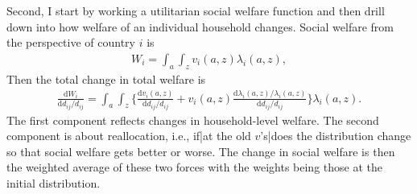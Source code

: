 \documentclass[12pt,pdftex]{article}
\begin{document}
\begin{onehalfspacing}
Second, I start by working a utilitarian social welfare function and then drill down into how welfare of an individual household changes. Social welfare from the perspective of country $i$ is
\begin{align}
W_{i} = \int_{a}\int_{z}  v_{i}(a,z)\lambda_{i}(a,z),
\label{eq:apx-social-welfare}
\end{align}
Then the total change in total welfare is
\begin{align}
\frac{\mathrm{d} W_{i}}{\mathrm{d} d_{ij} / d_{ij}} = \int_{a}\int_{z}  \bigg \{ \frac{\mathrm{d} v_i(a, z)}{\mathrm{d} d_{ij} / d_{ij}}  + v_{i}(a,z) \frac{\mathrm{d} \lambda_{i}(a,z)/ \lambda_{i}(a,z)}{\mathrm{d} d_{ij} / d_{ij}}  \bigg \} \lambda_{i}(a,z).
\label{eq:apx-social-welfare-change}
\end{align}
The first component reflects changes in household-level welfare. The second component is about reallocation, i.e., if|at the old $v$'s|does the distribution change so that social welfare gets better or worse. The change in social welfare is then the weighted average of these two forces with the weights being those at the initial distribution.


\end{onehalfspacing}
\end{document}
